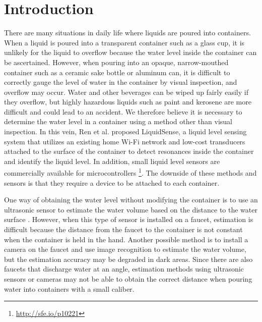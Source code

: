 \documentclass[manuscript,screen,review]{acmart}
\begin{document}
\section{Introduction}
There are many situations in daily life where liquids are poured into containers. When a liquid is poured into a transparent container such as a glass cup, it is unlikely for the liquid to overflow because the water level inside the container can be ascertained. However, when pouring into an opaque, narrow-mouthed container such as a ceramic sake bottle or aluminum can, it is difficult to correctly gauge the level of water in the container by visual inspection, and overflow may occur. Water and other beverages can be wiped up fairly easily if they overflow, but highly hazardous liquids such as paint and kerosene are more difficult and could lead to an accident. We therefore believe it is necessary to determine the water level in a container using a method other than visual inspection. In this vein, Ren et al. \cite{LiquidSense} proposed LiquidSense, a liquid level sensing system that utilizes an existing home Wi-Fi network and low-cost transducers attached to the surface of the container to detect resonances inside the container and identify the liquid level. In addition, small liquid level sensors are commercially available for microcontrollers \footnote{\url{http://sfe.io/p10221}}. The downside of these methods and sensors is that they require a device to be attached to each container.\par

One way of obtaining the water level without modifying the container is to use an ultrasonic sensor to estimate the water volume based on the distance to the water surface \cite{smart_faucet1}. However, when this type of sensor is installed on a faucet, estimation is difficult because the distance from the faucet to the container is not constant when the container is held in the hand. Another possible method is to install a camera on the faucet and use image recognition to estimate the water volume, but the estimation accuracy may be degraded in dark areas. Since there are also faucets that discharge water at an angle, estimation methods using ultrasonic sensors or cameras may not be able to obtain the correct distance when pouring water into containers with a small caliber.\par
\end{document}
